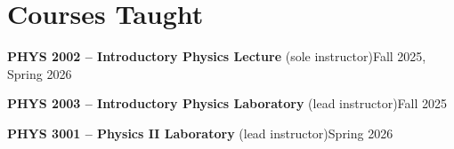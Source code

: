 \section{Courses Taught}
 
\begin{compact}
\noindent\textbf{PHYS 2002 -- Introductory Physics Lecture} (sole instructor)\hfill Fall 2025, Spring 2026\par
\noindent\textbf{PHYS 2003 -- Introductory Physics Laboratory} (lead instructor)\hfill Fall 2025\par
\noindent\textbf{PHYS 3001 -- Physics II Laboratory} (lead instructor)\hfill Spring 2026\par
\end{compact}